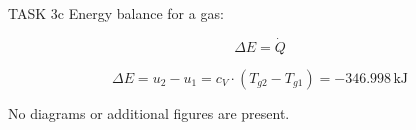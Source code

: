 TASK 3c  
Energy balance for a gas:  

\[
\Delta E = \dot{Q}
\]

\[
\Delta E = u_2 - u_1 = c_V \cdot (T_{g2} - T_{g1}) = -346.998 \, \text{kJ}
\]  

No diagrams or additional figures are present.